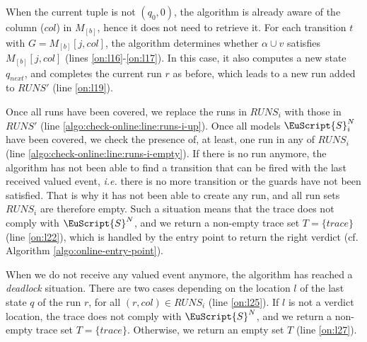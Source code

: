 When the current tuple is not $(q_0, 0)$, the algorithm is
already aware of the column ($col$) in $M_{[b]}$, hence it does not
need to retrieve it. For each transition $t$ with $G = M_{[b]}[j,
col]$, the algorithm determines whether $\alpha \cup v$ satisfies
$M_{[b]}[j, col]$ (lines \ref{on:l16}-\ref{on:l17}).
In this case, it also computes a new state $q_{next}$, and
completes the current run $r$ as before, which leads to a new
run added to $RUNS'$ (line \ref{on:l19}).

Once all runs have been covered, we replace the runs in  $RUNS_i$
with those in $RUNS'$ (line
\ref{algo:check-online:line:runs-i-up}). Once all models
$\EuScript{S}_i^N$ have been covered, we check the presence
of, at least, one run in any of $RUNS_i$ (line
\ref{algo:check-online:line:runs-i-empty}). If there is no run
anymore, the algorithm has not been able to find a transition
that can be fired with the last received valued event,
\emph{i.e.} there is no more transition or the guards have not
been satisfied. That is why it has not been able to create any
run, and all run sets $RUNS_i$ are therefore empty. Such a
situation means that the trace does not comply with
$\EuScript{S}^N$, and we return a non-empty trace set $T = \{
trace \}$ (line \ref{on:l22}), which is handled by the entry point to
return the right verdict (cf. Algorithm
\ref{algo:online-entry-point}).

When we do not receive any valued event anymore, the algorithm
has reached a \emph{deadlock} situation. There are two cases
depending on the location $l$ of the last state $q$ of the run
$r$, for all $(r, col) \in RUNS_i$ (line \ref{on:l25}).
If $l$ is not a verdict location, the trace does not
comply with  $\EuScript{S}^N$, and we return a non-empty trace
set $T = \{ trace \}$.  Otherwise, we return an empty set $T$
(line \ref{on:l27}).

